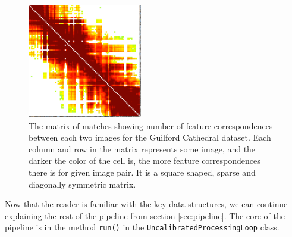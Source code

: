 \begin{figure}[ht]
	\begin{center}
		\includegraphics[keepaspectratio,width=5cm]{fig/matches-matrix.pdf}
	\end{center}
	\caption{The matrix of matches showing number of feature correspondences between each two images for the Guilford Cathedral dataset. Each column and row in the matrix represents some image, and the darker the color of the cell is, the more feature correspondences there is for given image pair. It is a square shaped, sparse and diagonally symmetric matrix. }
	\label{fig:matches-matrix}
\end{figure}


Now that the reader is familiar with the key data structures, we can continue explaining the rest of the pipeline from section \ref{sec:pipeline}. The core of the pipeline is in the method \texttt{run()} in the \texttt{UncalibratedProcessingLoop} class.


